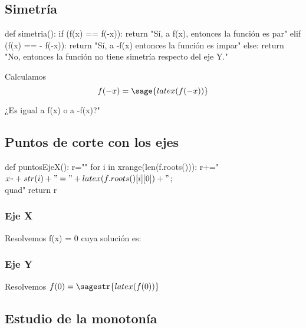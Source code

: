 
\subsection{Simetría}
\begin{sagesilent}
def simetria():
    if (f(x) == f(-x)):
        return "Sí, a f(x), entonces la función es par"
    elif (f(x) == - f(-x)):
        return "Sí, a -f(x) entonces la función es impar"
    else:
        return "No, entonces la función no tiene simetría respecto del eje Y."
\end{sagesilent}

Calculamos 
\[f(-x) = \sage{latex(f(-x))}\]

¿Es igual a f(x) o a -f(x)?" 

\subsection{Puntos de corte con los ejes}
\begin{sagesilent}
def puntosEjeX():
    r=""
    for i in xrange(len(f.roots())):
        r+="$x_"+str(i)+" = "+latex(f.roots()[i][0])+"$;\\quad"
    return r
\end{sagesilent}

\subsubsection{Eje X}
Resolvemos f(x) = 0 cuya solución es: 

\subsubsection{Eje Y}
Resolvemos $f(0)=\sagestr{latex(f(0))}$


\subsection{Estudio de la monotonía}

